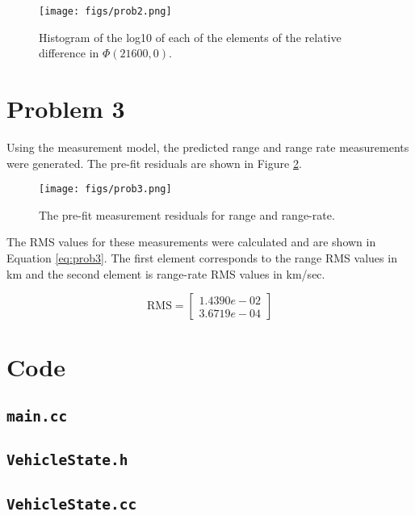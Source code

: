 \documentclass[11pt]{article}
\begin{document}
\begin{figure}[!htb]
	\centering
	\texttt{[image: figs/prob2.png]}
	\caption{Histogram of the log10 of each of the elements of the relative difference in $\Phi(21600,0)$.}
	\label{fig:prob2Phi}
\end{figure}

\section{Problem 3}

Using the measurement model, the predicted range and range rate measurements were generated. The pre-fit residuals are shown in Figure \ref{fig:prob3}. \\

\begin{figure}[!htb]
	\centering
	\texttt{[image: figs/prob3.png]}
	\caption{The pre-fit measurement residuals for range and range-rate.}
	\label{fig:prob3}
\end{figure}

The RMS values for these measurements were calculated and are shown in Equation \eqref{eq:prob3}. The first element corresponds to the range RMS values in km and the second element is range-rate RMS values in km/sec.

\begin{equation}
\label{eq:prob3}
\text{RMS} = \begin{bmatrix}
	1.4390e-02 \\
	3.6719e-04
\end{bmatrix}
\end{equation}


\newpage
\appendix
\section{Code}

\subsection{\texttt{main.cc}}


\subsection{\texttt{VehicleState.h}}


\subsection{\texttt{VehicleState.cc}}

\end{document}
